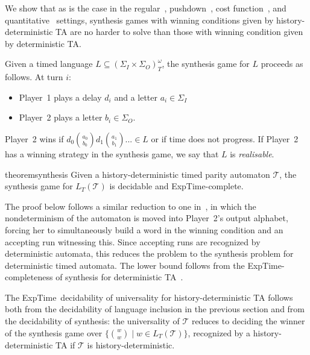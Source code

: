 \documentclass[10pt,a4paper]{amsart}
\theoremstyle{definition}
\numberwithin{equation}{section}
\newcommand{\T}{\mathcal{T}}
\newcommand{\exptime}{\EXPTIME}
\newcommand{\lang}{L_T}  %
\newcommand{\EXPTIME}{{\sc ExpTime}}
\begin{document}
We show that as is the case in the regular~\cite{HP06}, pushdown~\cite{LZ22}, cost function~\cite{Col09}, and quantitative~\cite{BL21} settings, synthesis games with winning conditions given by history-deterministic TA are no harder to solve than those with winning condition given by deterministic TA.


\begin{definition}
	Given a timed language $L\subseteq (\Sigma_I\times \Sigma_O)^\omega_T$, the synthesis game for $L$ proceeds as follows.
	At turn $i$:
	\begin{itemize}
		\item Player~1 plays a delay $d_i$ and a letter $a_i\in \Sigma_I$
		\item Player~2 plays a letter $b_i\in \Sigma_O$.
	\end{itemize}
	Player~2 wins if $d_0\binom{a_0}{b_0}d_1\binom{a_1}{b_1}...\in L$ or if time does not progress.
If Player~2 has a winning strategy in the synthesis game, we say that $L$ is \emph{realisable}.
\end{definition}




\begin{restatable}{theorem}{synthesis}
    \label{thm:synthesis}
	Given a history-deterministic timed parity automaton $\T$, the synthesis game for $\lang(\T)$ is decidable and \exptime-complete.
\end{restatable}


The proof below follows a similar reduction to one in~\cite{LZ22}, in which the nondeterminism of the automaton is moved into Player~2's output alphabet, forcing her to simultaneously build a word in the winning condition and an accepting run witnessing this. Since accepting runs are recognized by deterministic automata, this reduces the problem to the synthesis problem for deterministic timed automata.	The lower bound follows from the \exptime-completeness of synthesis for deterministic TA~\cite{DM2002}.

The \exptime\ decidability of universality for history-deterministic TA follows both from the decidability of language inclusion in the previous section and from the decidability of synthesis: the universality of $\T$ reduces to deciding the winner of the synthesis game over $\{\binom{w}{w}\mid w\in \lang(\T)\}$, recognized by a history-deterministic TA if $\T$ is history-deterministic.
\end{document}
